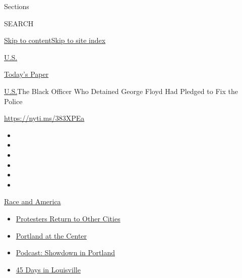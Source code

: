 Sections

SEARCH

\protect\hyperlink{site-content}{Skip to
content}\protect\hyperlink{site-index}{Skip to site index}

\href{https://www.nytimes3xbfgragh.onion/section/us}{U.S.}

\href{https://myaccount.nytimes3xbfgragh.onion/auth/login?response_type=cookie\&client_id=vi}{}

\href{https://www.nytimes3xbfgragh.onion/section/todayspaper}{Today's
Paper}

\href{/section/us}{U.S.}\textbar{}The Black Officer Who Detained George
Floyd Had Pledged to Fix the Police

\url{https://nyti.ms/383XPEa}

\begin{itemize}
\item
\item
\item
\item
\item
\item
\end{itemize}

\href{https://www.nytimes3xbfgragh.onion/news-event/george-floyd-protests-minneapolis-new-york-los-angeles?action=click\&pgtype=Article\&state=default\&region=TOP_BANNER\&context=storylines_menu}{Race
and America}

\begin{itemize}
\tightlist
\item
  \href{https://www.nytimes3xbfgragh.onion/2020/07/26/us/protests-portland-seattle-trump.html?action=click\&pgtype=Article\&state=default\&region=TOP_BANNER\&context=storylines_menu}{Protesters
  Return to Other Cities}
\item
  \href{https://www.nytimes3xbfgragh.onion/2020/07/24/us/portland-oregon-protests-white-race.html?action=click\&pgtype=Article\&state=default\&region=TOP_BANNER\&context=storylines_menu}{Portland
  at the Center}
\item
  \href{https://www.nytimes3xbfgragh.onion/2020/07/23/podcasts/the-daily/portland-protests.html?action=click\&pgtype=Article\&state=default\&region=TOP_BANNER\&context=storylines_menu}{Podcast:
  Showdown in Portland}
\item
  \href{https://www.nytimes3xbfgragh.onion/interactive/2020/07/16/us/black-lives-matter-protests-louisville-breonna-taylor.html?action=click\&pgtype=Article\&state=default\&region=TOP_BANNER\&context=storylines_menu}{45
  Days in Louisville}
\end{itemize}

